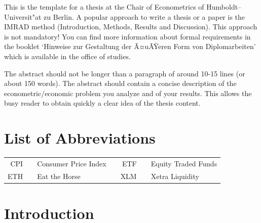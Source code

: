 \documentclass[a4paper,11pt]{article}
\begin{document}
This is the template for a thesis at the Chair of Econometrics of
Humboldt--Universit"at zu Berlin. A popular approach to write a thesis or a
paper is the IMRAD method (Introduction, Methods, Results and Discussion). This
approach is not mandatory! You can find more information about formal
requirements in the booklet `Hinweise zur Gestaltung der Ã¤uÃŸeren Form von
Diplomarbeiten' which is available in the office of studies.

The abstract should not be longer than a paragraph of around 10-15 lines (or
about 150 words). The abstract should contain a concise description of the
econometric/economic problem you analyze and of your results. This allows the
busy reader to obtain quickly a clear idea of the thesis content.

\newpage
\hypertarget{list-of-abbreviations}{%
\section*{List of Abbreviations}\label{list-of-abbreviations}}
\begin{tabular}{rp{0.2cm}lp{1cm}rp{0.2cm}l}
    CPI     & &  Consumer Price Index   & & ETF     & &  Equity Traded Funds  \\
    ETH     & &  Eat the Horse          & & XLM     & &  Xetra Liquidity
\end{tabular}
\newpage
\listoffigures
{}

\newpage
\listoftables
{}

\newpage
\pagestyle{plain}       
\setcounter{page}{1}    %

\hypertarget{introduction}{%
\section{Introduction}\label{introduction}}
\end{document}
